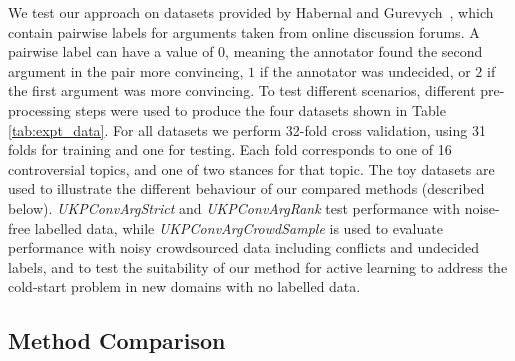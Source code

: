 We test our approach on datasets provided by Habernal and Gurevych~,
which contain pairwise labels for arguments taken from online discussion forums.
A pairwise label can have a value of $0$, meaning the annotator found the second argument in the pair more convincing,
$1$ if the annotator was undecided, or $2$ if the first argument was more convincing.
To test different scenarios, different pre-processing steps were used to produce the
four datasets shown in Table \ref{tab:expt_data}.
For all datasets we perform 32-fold cross validation, using 31 folds for training and one for testing. 
Each fold corresponds to one of 16 controversial topics, and one of two stances for that topic.
The toy datasets are used to illustrate the different behaviour of our compared methods (described below).
\emph{UKPConvArgStrict} and \emph{UKPConvArgRank} test performance with noise-free labelled data,
while \emph{UKPConvArgCrowdSample} is used to evaluate performance with noisy crowdsourced data 
including conflicts and undecided labels, and to test the suitability of our method for active learning
to address the cold-start problem in new domains with no labelled data.
 
\subsection{Method Comparison}

